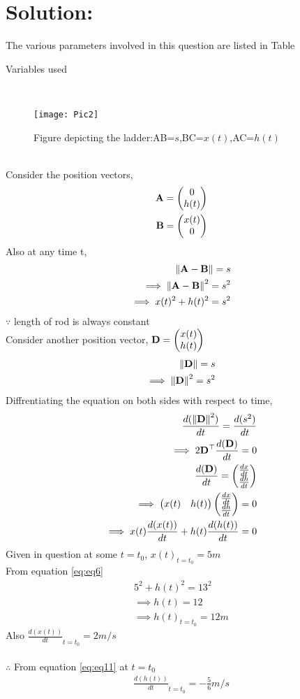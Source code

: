 \documentclass[journal,12pt,twocolumn]{IEEEtran}
\begin{document}
	\section{Solution:}
	The various parameters involved in this question are listed in Table \begin{table}[h]
\caption{Variables used}

\end{table}
\\
\begin{figure}[h]
\texttt{[image: Pic2]}
\caption{Figure depicting the ladder:AB=$s$,BC=$x(t)$,AC=$h(t)$}
\label{fig:my_label}
\end{figure}
\\
Consider the position vectors,\\
\begin{align}
\mathbf{A} = \begin{pmatrix} 0 \\ h(t)\end{pmatrix}\\
 \mathbf{B} = \begin{pmatrix} x(t) \\ 0\end{pmatrix}
\end{align}
Also at any time t, 
\begin{align}
\left\lVert\mathbf{A}-\mathbf{B}\right\rVert=s\\
\implies\left\lVert\mathbf{A}-\mathbf{B}\right\rVert^{2}=s^2\\
\implies x(t)^2+h(t)^2=s^2
\label{eq:eq6}
\end{align}
$\because$ length of rod is always constant\\
Consider another position vector,
$\mathbf{D} = \begin{pmatrix}x(t)\\ h(t)\end{pmatrix}$ 
\begin{align}
\left\lVert\mathbf{D}\right\rVert=s\\
\implies \left\lVert\mathbf{D}\right\rVert^{2}=s^2
\end{align}
Diffrentiating the equation on both sides with respect to time,\\
\begin{align}
\frac{d(\left\lVert\mathbf{D}\right\rVert^{2})}{dt}=\frac{d(s^{2})}{dt}\\
\implies 2\mathbf{D}^{\top}\frac{d(\mathbf{D})}{dt}=0\\
\frac{d(\mathbf{D})}{dt}=\begin{pmatrix}\frac{dx}{dt} \\ \frac{dh}{dt}\end{pmatrix}\\
\implies \begin{pmatrix}x(t)&h(t)\end{pmatrix}\begin{pmatrix}\frac{dx}{dt} \\ \frac{dh}{dt}\end{pmatrix}=0\\
\implies x(t)\frac{d(x(t))}{dt}+h(t)\frac{d(h(t))}{dt}=0
\label{eq:eq11}
\end{align}
Given in question at some $t=t_0$, $x(t)_{t=t_{0}}=5 m$\\
From equation \eqref{eq:eq6}
\begin{align}
5^2+h(t)^2=13^2\\
\implies h(t)=12\\
\implies h(t)_{t=t_{0}}=12 m
\end{align}
Also $\frac{d(x(t))}{dt}_{t=t_0}=2 m/s$\\
\\
$\therefore$ From equation \eqref{eq:eq11} at $t=t_0$
\begin{align}
\frac{d(h(t))}{dt}_{t=t_0}=-\frac{5}{6} m/s
\end{align}
\end{document}
